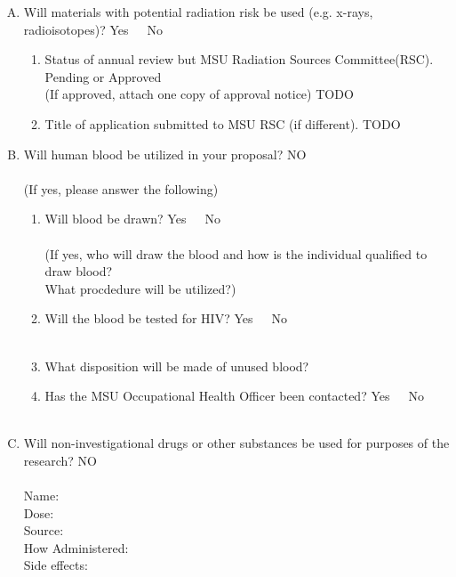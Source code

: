 \documentclass{article}
\newcommand{\response}[1]{{\color{blue}#1}}
\newcommand{\no}{{\color{blue}NO}\\ }
\newcommand{\yn}{{Yes~~~No\\ }}
\begin{document}
\begin{enumerate}[I.]
\begin{enumerate}[A.]
        \item Will materials with potential radiation risk be used (e.g. x-rays,
            radioisotopes)? \yn

        \begin{enumerate}[1.]
            \item Status of annual review but MSU Radiation Sources Committee(RSC). Pending or Approved \\
                (If approved, attach one copy of approval notice)
                \response{TODO}

            \item Title of application submitted to MSU RSC (if different). \response{TODO}

        \end{enumerate}
        \item Will human blood be utilized in your proposal? \no \\
        (If yes, please answer the following)

        \begin{enumerate}[1.]
            \item Will blood be drawn? \yn \\
            (If yes, who will draw the blood and how is the individual qualified to draw blood? \\
            What procdedure will be utilized?)\\

            \item Will the blood be tested for HIV? \yn \\

            \item What disposition will be made of unused blood? \\

            \item Has the MSU Occupational Health Officer been contacted? \yn \\

        \end{enumerate}

        \item Will non-investigational drugs or other substances be used for
            purposes of the research? \no \\

        Name:\\
        Dose:\\
        Source:\\
        How Administered:\\
        Side effects:\\


\end{enumerate}
\end{enumerate}
\end{document}
